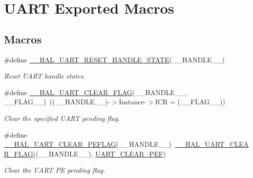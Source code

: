 \hypertarget{group___u_a_r_t___exported___macros}{}\section{U\+A\+RT Exported Macros}
\label{group___u_a_r_t___exported___macros}
\subsection*{Macros}
\begin{DoxyCompactItemize}
\item 
\#define \hyperlink{group___u_a_r_t___exported___macros_ga19deab848407b106998416c78092fa9b}{\+\_\+\+\_\+\+H\+A\+L\+\_\+\+U\+A\+R\+T\+\_\+\+R\+E\+S\+E\+T\+\_\+\+H\+A\+N\+D\+L\+E\+\_\+\+S\+T\+A\+TE}(\+\_\+\+\_\+\+H\+A\+N\+D\+L\+E\+\_\+\+\_\+)
\begin{DoxyCompactList}\small\item\em Reset U\+A\+RT handle states. \end{DoxyCompactList}\item 
\#define \hyperlink{group___u_a_r_t___exported___macros_ga9bd035161d41cde4f2568c7af06493bf}{\+\_\+\+\_\+\+H\+A\+L\+\_\+\+U\+A\+R\+T\+\_\+\+C\+L\+E\+A\+R\+\_\+\+F\+L\+AG}(\+\_\+\+\_\+\+H\+A\+N\+D\+L\+E\+\_\+\+\_\+,  \+\_\+\+\_\+\+F\+L\+A\+G\+\_\+\+\_\+)~((\+\_\+\+\_\+\+H\+A\+N\+D\+L\+E\+\_\+\+\_\+)-\/$>$Instance-\/$>$I\+CR = (\+\_\+\+\_\+\+F\+L\+A\+G\+\_\+\+\_\+))
\begin{DoxyCompactList}\small\item\em Clear the specified U\+A\+RT pending flag. \end{DoxyCompactList}\item 
\#define \hyperlink{group___u_a_r_t___exported___macros_gaba5e19c60e0f37341b1585a380b84d49}{\+\_\+\+\_\+\+H\+A\+L\+\_\+\+U\+A\+R\+T\+\_\+\+C\+L\+E\+A\+R\+\_\+\+P\+E\+F\+L\+AG}(\+\_\+\+\_\+\+H\+A\+N\+D\+L\+E\+\_\+\+\_\+)~\hyperlink{group___u_a_r_t___exported___macros_ga9bd035161d41cde4f2568c7af06493bf}{\+\_\+\+\_\+\+H\+A\+L\+\_\+\+U\+A\+R\+T\+\_\+\+C\+L\+E\+A\+R\+\_\+\+F\+L\+AG}((\+\_\+\+\_\+\+H\+A\+N\+D\+L\+E\+\_\+\+\_\+), \hyperlink{group___u_a_r_t___i_t___c_l_e_a_r___flags_ga9c2aef8048dd09ea5e72d69c63026f02}{U\+A\+R\+T\+\_\+\+C\+L\+E\+A\+R\+\_\+\+P\+EF})
\begin{DoxyCompactList}\small\item\em Clear the U\+A\+RT PE pending flag. \end{DoxyCompactList}\item 

\end{DoxyCompactItemize}

